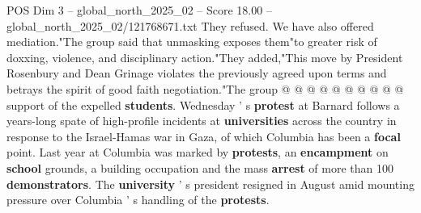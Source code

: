 \begin{textsample}{POS Dim 3 – global\_north\_2025\_02 – Score 18.00 – global\_north\_2025\_02/121768671.txt}
They refused.
We have also offered mediation."The group said that unmasking exposes them"to greater risk of doxxing, violence, and disciplinary action."They added,"This move by President Rosenbury and Dean Grinage violates the previously agreed upon terms and betrays the spirit of good faith negotiation."The group @ @ @ @ @ @ @ @ @ @ support of the expelled \textbf{students}.
Wednesday ' s \textbf{protest} at Barnard follows a years-long spate of high-profile incidents at \textbf{universities} across the country in response to the Israel-Hamas war in Gaza, of which Columbia has been a \textbf{focal} point.
Last year at Columbia was marked by \textbf{protests}, an \textbf{encampment} on \textbf{school} grounds, a building occupation and the mass \textbf{arrest} of more than 100 \textbf{demonstrators}.
The \textbf{university} ' s president resigned in August amid mounting pressure over Columbia ' s handling of the \textbf{protests}.

\end{textsample}
